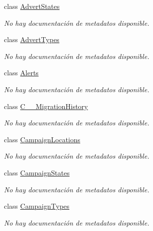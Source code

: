 \begin{DoxyCompactItemize}
class \hyperlink{class_microsoft_1_1_samples_1_1_kinect_1_1_basic_interactions_1_1_advert_states}{Advert\-States}
\begin{DoxyCompactList}\small\item\em No hay documentación de metadatos disponible. \end{DoxyCompactList}\item 
class \hyperlink{class_microsoft_1_1_samples_1_1_kinect_1_1_basic_interactions_1_1_advert_types}{Advert\-Types}
\begin{DoxyCompactList}\small\item\em No hay documentación de metadatos disponible. \end{DoxyCompactList}\item 
class \hyperlink{class_microsoft_1_1_samples_1_1_kinect_1_1_basic_interactions_1_1_alerts}{Alerts}
\begin{DoxyCompactList}\small\item\em No hay documentación de metadatos disponible. \end{DoxyCompactList}\item 
class \hyperlink{class_microsoft_1_1_samples_1_1_kinect_1_1_basic_interactions_1_1_c_____migration_history}{C\-\_\-\-\_\-\-Migration\-History}
\begin{DoxyCompactList}\small\item\em No hay documentación de metadatos disponible. \end{DoxyCompactList}\item 
class \hyperlink{class_microsoft_1_1_samples_1_1_kinect_1_1_basic_interactions_1_1_campaign_locations}{Campaign\-Locations}
\begin{DoxyCompactList}\small\item\em No hay documentación de metadatos disponible. \end{DoxyCompactList}\item 
class \hyperlink{class_microsoft_1_1_samples_1_1_kinect_1_1_basic_interactions_1_1_campaign_states}{Campaign\-States}
\begin{DoxyCompactList}\small\item\em No hay documentación de metadatos disponible. \end{DoxyCompactList}\item 
class \hyperlink{class_microsoft_1_1_samples_1_1_kinect_1_1_basic_interactions_1_1_campaign_types}{Campaign\-Types}
\begin{DoxyCompactList}\small\item\em No hay documentación de metadatos disponible. \end{DoxyCompactList}\item 

\end{DoxyCompactItemize}
